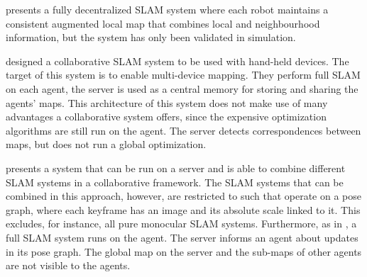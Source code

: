 \documentclass{article}
\begin{document}
\cite{cunningham2013ddf} presents a fully decentralized SLAM system where
each robot maintains a consistent augmented local map that combines local and
neighbourhood information, but the system has only been validated in
simulation.

\cite{morrison2016moarslam} designed a collaborative SLAM system to be used
with hand-held devices. The target of this system is to enable multi-device
mapping. They perform full SLAM on each agent, the server is used as a central
memory for storing and sharing the agents' maps. This architecture of this
system does not make use of many advantages a collaborative system offers,
since the expensive optimization algorithms are still run on the agent. The
server detects correspondences between maps, but does not run a global
optimization.

\cite{deutsch2016framework} presents a system that can be run on a server and
is able to combine different SLAM systems in a collaborative framework. The
SLAM systems that can be combined in this approach, however, are restricted to
such that operate on a pose graph, where each keyframe has an image and its
absolute scale linked to it. This excludes, for instance, all pure monocular
SLAM systems. Furthermore, as in \cite{morrison2016moarslam}, a full SLAM
system runs on the agent. The server informs an agent about updates in its pose
graph. The global map on the server and the sub-maps of other agents are not
visible to the agents.
\end{document}
